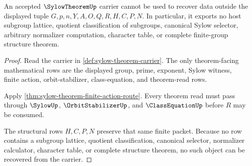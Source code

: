 \begin{theorem}
\label{thm:sylow-theorem-nonescape}
An accepted $\SylowTheoremUp$ carrier cannot be used to recover data outside the displayed tuple $G,p,n,Y,A,O,Q,R,H,C,P,N$. In particular, it exports no host subgroup lattice, quotient classification of subgroups, canonical Sylow selector, arbitrary normalizer computation, character table, or complete finite-group structure theorem.
\end{theorem}
\begin{proof}
Read the carrier in \autoref{def:sylow-theorem-carrier}. The only theorem-facing mathematical rows are the displayed group, prime, exponent, Sylow witness, finite action, orbit-stabilizer, class-equation, and theorem-read rows.

Apply \autoref{thm:sylow-theorem-finite-action-route}. Every theorem read must pass through $\SylowUp$, $\OrbitStabilizerUp$, and $\ClassEquationUp$ before $R$ may be consumed.

The structural rows $H,C,P,N$ preserve that same finite packet. Because no row contains a subgroup lattice, quotient classification, canonical selector, normalizer calculator, character table, or complete structure theorem, no such object can be recovered from the carrier.
\end{proof}




